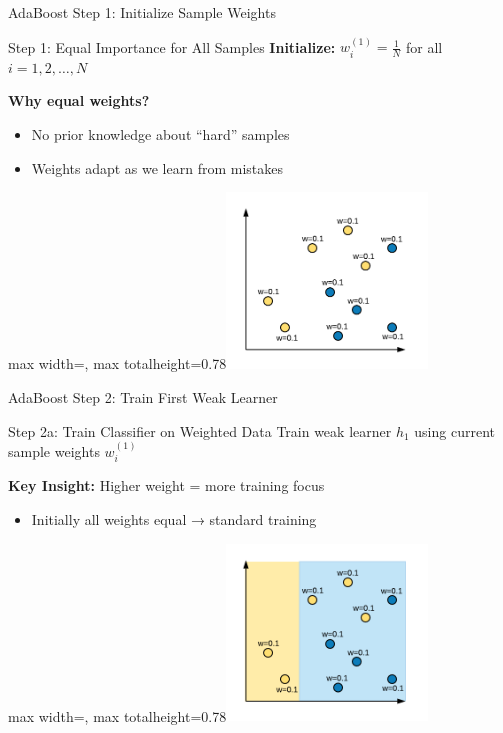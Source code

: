 \documentclass[9pt]{beamer}
\newcommand{\fitpic}[1]{\begin{adjustbox}{max width=\linewidth, max totalheight=0.78\textheight}#1\end{adjustbox}}
\begin{document}
\begin{frame}{AdaBoost Step 1: Initialize Sample Weights}
\begin{alertbox}{Step 1: Equal Importance for All Samples}
\textbf{Initialize:} $w_i^{(1)} = \frac{1}{N}$ for all $i = 1, 2, \ldots, N$
\end{alertbox}

\textbf{Why equal weights?}
\begin{itemize}
\item No prior knowledge about ``hard'' samples
\item Weights adapt as we learn from mistakes
\end{itemize}

  \vspace{0.3cm}
  \centering
  \fitpic{\includegraphics[width = 0.4\textwidth]{../assets/ensemble/diagrams/ada_data_init_weights}}
\end{frame}

\begin{frame}{AdaBoost Step 2: Train First Weak Learner}
\begin{alertbox}{Step 2a: Train Classifier on Weighted Data}
Train weak learner $h_1$ using current sample weights $w_i^{(1)}$
\end{alertbox}

\begin{keypointsbox}
\textbf{Key Insight:} Higher weight = more training focus
\begin{itemize}
\item Initially all weights equal → standard training
\end{itemize}
\end{keypointsbox}

  \vspace{0.3cm}
  \centering
  \fitpic{\includegraphics[width = 0.4\textwidth]{../assets/ensemble/diagrams/ada_iter1}}
\end{frame}
\end{document}
